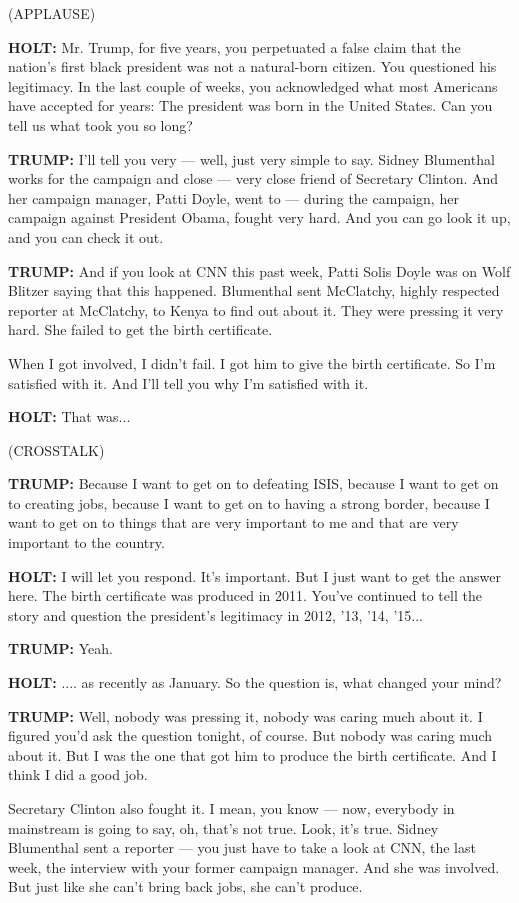 (APPLAUSE)

\textbf{HOLT:} Mr. Trump, for five years, you perpetuated a false claim
that the nation's first black president was not a natural-born citizen.
You questioned his legitimacy. In the last couple of weeks, you
acknowledged what most Americans have accepted for years: The president
was born in the United States. Can you tell us what took you so long?

\textbf{TRUMP:} I'll tell you very --- well, just very simple to say.
Sidney Blumenthal works for the campaign and close --- very close friend
of Secretary Clinton. And her campaign manager, Patti Doyle, went to ---
during the campaign, her campaign against President Obama, fought very
hard. And you can go look it up, and you can check it out.

\textbf{TRUMP:} And if you look at CNN this past week, Patti Solis Doyle
was on Wolf Blitzer saying that this happened. Blumenthal sent
McClatchy, highly respected reporter at McClatchy, to Kenya to find out
about it. They were pressing it very hard. She failed to get the birth
certificate.

When I got involved, I didn't fail. I got him to give the birth
certificate. So I'm satisfied with it. And I'll tell you why I'm
satisfied with it.

\textbf{HOLT:} That was...

(CROSSTALK)

\textbf{TRUMP:} Because I want to get on to defeating ISIS, because I
want to get on to creating jobs, because I want to get on to having a
strong border, because I want to get on to things that are very
important to me and that are very important to the country.

\textbf{HOLT:} I will let you respond. It's important. But I just want
to get the answer here. The birth certificate was produced in 2011.
You've continued to tell the story and question the president's
legitimacy in 2012, '13, '14, '15...

\textbf{TRUMP:} Yeah.

\textbf{HOLT:} .... as recently as January. So the question is, what
changed your mind?

\textbf{TRUMP:} Well, nobody was pressing it, nobody was caring much
about it. I figured you'd ask the question tonight, of course. But
nobody was caring much about it. But I was the one that got him to
produce the birth certificate. And I think I did a good job.

Secretary Clinton also fought it. I mean, you know --- now, everybody in
mainstream is going to say, oh, that's not true. Look, it's true. Sidney
Blumenthal sent a reporter --- you just have to take a look at CNN, the
last week, the interview with your former campaign manager. And she was
involved. But just like she can't bring back jobs, she can't produce.

